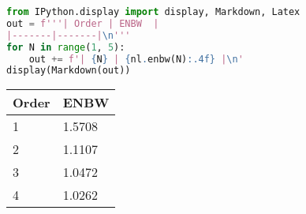 \begin{lstlisting}[language=Python]
from IPython.display import display, Markdown, Latex
out = f'''| Order | ENBW  |
|-------|-------|\n'''
for N in range(1, 5):
    out += f'| {N} | {nl.enbw(N):.4f} |\n'
display(Markdown(out))
\end{lstlisting}

\begin{longtable}[]{@{}ll@{}}
\toprule
Order & ENBW \\
\midrule
\endhead
1 & 1.5708 \\
2 & 1.1107 \\
3 & 1.0472 \\
4 & 1.0262 \\
\bottomrule
\end{longtable}

\begin{lstlisting}[language=Python]
\end{lstlisting}
